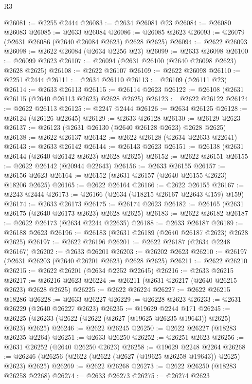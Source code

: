 \begin{lexlean}{R3}
\begin{coremodule}
@26081 := @2255 @2444
@26083 := @2634 @26081 @23
@26084 := @26080 @26083
@26085 := @2633 @26084
@26086 := @26085 @2623
@26093 := @26079 (@2631 @26086 (@2640 @26084 @2623) @2628 @2625)
@26094 := @2622 @26093
@26098 := @2622 @26084 (@2634 @2256 @23)
@26099 := @2633 @26098
@26100 := @26099 @2623
@26107 := @26094 (@2631 @26100 (@2640 @26098 @2623) @2628 @2625)
@26108 := @2622 @26107
@26109 := @2622 @26098
@26110 := @2251 @2444
@26111 := @2634 @26110
@26113 := @26109 (@26111 @23)
@26114 := @2633 @26113
@26115 := @26114 @2623
@26122 := @26108 (@2631 @26115 (@2640 @26113 @2623) @2628 @2625)
@26123 := @2622 @26122
@26124 := @2622 @26113
@26125 := @2247 @2444
@26126 := @2634 @26125
@26128 := @26124 (@26126 @22645)
@26129 := @2633 @26128
@26130 := @26129 @2623
@26137 := @26123 (@2631 @26130 (@2640 @26128 @2623) @2628 @2625)
@26138 := @2622 @26137
@26142 := @2622 @26128 (@2634 @22633 @22641)
@26143 := @2633 @26142
@26144 := @26143 @2623
@26151 := @26138 (@2631 @26144 (@2640 @26142 @2623) @2628 @2625)
@26152 := @2622 @26151
@26155 := @2622 @26142 (@20944 @22643)
@26156 := @2633 @26155
@26157 := @26156 @2623
@26164 := @26152 (@2631 @26157 (@2640 @26155 @2623) @18206 @2625)
@26165 := @2622 @26164
@26166 := @2622 @26155
@26167 := @2243 @2444
@26173 := @26166 (@2634 (@18215 @26167 @22643 @159) @159)
@26174 := @2633 @26173
@26175 := @26174 @2623
@26182 := @26165 (@2631 @26175 (@2640 @26173 @2623) @2628 @2625)
@26183 := @2622 @26182
@26187 := @2622 @26173 (@2634 @2244 @22635)
@26188 := @2633 @26187
@26189 := @26188 @2623
@26196 := @26183 (@2631 @26189 (@2640 @26187 @2623) @2628 @2625)
@26197 := @2622 @26196
@26201 := @2622 @26187 (@2634 @2248 @26167)
@26202 := @2633 @26201
@26203 := @26202 @2623
@26210 := @26197 (@2631 @26203 (@2640 @26201 @2623) @2628 @2625)
@26211 := @2622 @26210
@26215 := @2622 @26201 (@2634 @2252 @22645)
@26216 := @2633 @26215
@26217 := @26216 @2623
@26224 := @26211 (@2631 @26217 (@2640 @26215 @2623) @2628 @2625)
@26225 := @2622 @26224
@26227 := @2622 @26215 @18286
@26228 := @2633 @26227
@26229 := @26228 @2623
@26233 := @2631 @26229 (@2640 @26227 @2623)
@26235 := @19629 @2244 @171
@26245 := @26225 (@26233 (@2622 (@2622 (@2627 (@19625 @26235 @19643)) @2625) @2623) @2625)
@26246 := @2622 @26245
@26250 := @2622 @26227 (@18283 @26235 @2264)
@26251 := @2633 @26250
@26252 := @26251 @2623
@26256 := @2631 @26252 (@2640 @26250 @2623)
@26258 := @19629 @2248 @2264
@26268 := @26246 (@26256 (@2622 (@2622 (@2627 (@19625 @26258 @19643)) @2625) @2623) @2625)
@26269 := @2622 @26268
@26273 := @2622 @26250 (@18283 @26258 @2268)
@26274 := @2633 @26273
@26275 := @26274 @2623

\end{coremodule}
\end{lexlean}
